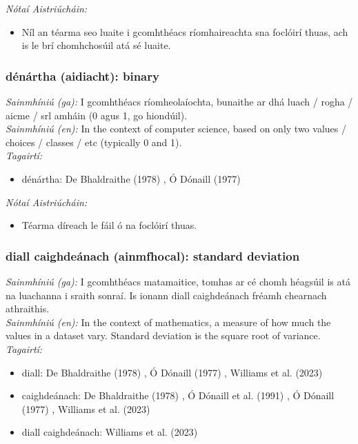  \noindent \textit{Nótaí Aistriúcháin:}
\begin{itemize}
	\item Níl an téarma seo luaite i gcomhthéacs ríomhaireachta sna foclóirí thuas, ach is le brí chomhchosúil atá sé luaite.
\end{itemize}


\subsubsection*{dénártha (aidiacht): binary}
 \noindent \textit{Sainmhíniú (ga):} I gcomhthéacs ríomheolaíochta, bunaithe ar dhá luach / rogha / aicme / srl amháin (0 agus 1, go hiondúil).
\\
 \noindent \textit{Sainmhíniú (en):} In the context of computer science, based on only two values / choices / classes / etc (typically 0 and 1).
\\
 \noindent \textit{Tagairtí:}
\begin{itemize}
	\item dénártha: De Bhaldraithe (1978) \cite{de-bhaldraithe}, Ó Dónaill (1977) \cite{odonaill}
\end{itemize}

 \noindent \textit{Nótaí Aistriúcháin:}
\begin{itemize}
	\item Téarma díreach le fáil ó na foclóirí thuas.
\end{itemize}


\subsubsection*{diall caighdeánach (ainmfhocal): standard deviation}
 \noindent \textit{Sainmhíniú (ga):} I gcomhthéacs matamaitice, tomhas ar cé chomh héagsúil is atá na luachanna i sraith sonraí. Is ionann diall caighdeánach fréamh chearnach athraithis.
\\
 \noindent \textit{Sainmhíniú (en):} In the context of mathematics, a measure of how much the values in a dataset vary. Standard deviation is the square root of variance.
\\
 \noindent \textit{Tagairtí:}
\begin{itemize}
	\item diall: De Bhaldraithe (1978) \cite{de-bhaldraithe}, Ó Dónaill (1977) \cite{odonaill}, Williams et al. (2023) \cite{storchiste}
	\item caighdeánach: De Bhaldraithe (1978) \cite{de-bhaldraithe}, Ó Dónaill et al. (1991) \cite{focloir-beag}, Ó Dónaill (1977) \cite{odonaill}, Williams et al. (2023) \cite{storchiste}
	\item diall caighdeánach: Williams et al. (2023) \cite{storchiste}
\end{itemize}


